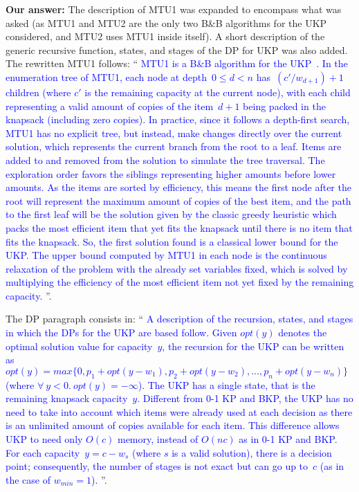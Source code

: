 \documentclass{elsarticle}
\begin{document}
\textbf{Our answer:} The description of MTU1 was expanded to encompass what was asked (as MTU1 and MTU2 are the only two B\&B algorithms for the UKP considered, and MTU2 uses MTU1 inside itself). A short description of the generic recursive function, states, and stages of the DP for UKP was also added. The rewritten MTU1 follows: ``\textcolor{blue}{
MTU1 is a B\&B algorithm for the UKP~\citep{mtu1}. %
In the enumeration tree of MTU1, each node at depth~\(0 \leq d < n\) has~\((c'/w_{d+1}) + 1\) children (where \(c'\) is the remaining capacity at the current node), with each child representing a valid amount of copies of the item~\(d+1\) being packed in the knapsack (including zero copies).
In practice, since it follows a depth-first search, MTU1 has no explicit tree, but instead, make changes directly over the current solution, which represents the current branch from the root to a leaf.
Items are added to and removed from the solution to simulate the tree traversal.
The exploration order favors the siblings representing higher amounts before lower amounts.
As the items are sorted by efficiency, this means the first node after the root will represent the maximum amount of copies of the best item, and the path to the first leaf will be the solution given by the classic greedy heuristic which packs the most efficient item that yet fits the knapsack until there is no item that fits the knapsack. So, the first solution found is a classical lower bound for the UKP.
The upper bound computed by MTU1 in each node is the continuous relaxation of the problem with the already set variables fixed, which is solved by multiplying the efficiency of the most efficient item not yet fixed by the remaining capacity.
}''.

The DP paragraph consists in: ``\textcolor{blue}{
A description of the recursion, states, and stages in which the DPs for the UKP are based follow.
Given \(opt(y)\) denotes the optimal solution value for capacity~\(y\), the recursion for the UKP can be written as \(opt(y) = max \{0, p_1 + opt(y - w_1), p_2 + opt(y - w_2), \dots, p_n + opt(y - w_n)\}\) (where \(\forall~y < 0.~opt(y) = -\infty\)).
The UKP has a single state, that is the remaining knapsack capacity~\(y\).
Different from 0-1 KP and BKP, the UKP has no need to take into account which items were already used at each decision as there is an unlimited amount of copies available for each item.
This difference allows UKP to need only \(O(c)\) memory, instead of \(O(nc)\) as in 0-1 KP and BKP.
For each capacity~\(y = c - w_s\) (where \(s\) is a valid solution), there is a decision point; consequently, the number of stages is not exact but can go up to~\(c\) (as in the case of \(w_{min} = 1\)).
}''.
\bigskip
\end{document}
